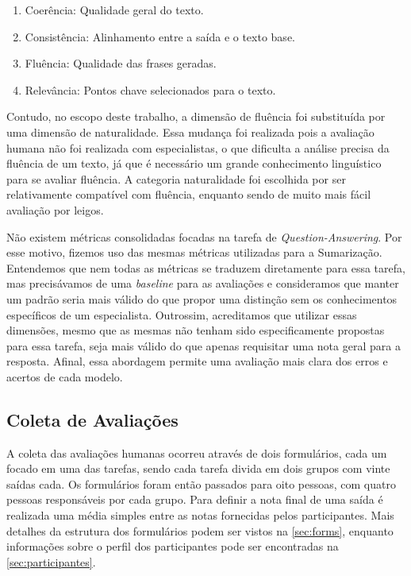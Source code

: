 \documentclass[cic,tc]{iiufrgs}
\begin{document}
\begin{enumerate}
    \item Coerência: Qualidade geral do texto.
    \item Consistência: Alinhamento entre a saída e o texto base.
    \item Fluência: Qualidade das frases geradas.
    \item Relevância: Pontos chave selecionados para o texto.
\end{enumerate}

Contudo, no escopo deste trabalho, a dimensão de fluência foi substituída por uma dimensão de naturalidade. 
Essa mudança foi realizada pois a avaliação humana não foi realizada com especialistas, o que dificulta a análise precisa da fluência de um texto, já que é necessário um grande conhecimento linguístico para se avaliar fluência. 
A categoria naturalidade foi escolhida por ser relativamente compatível com fluência, enquanto sendo de muito mais fácil avaliação por leigos.

Não existem métricas consolidadas focadas na tarefa de \textit{Question-Answering}. Por esse motivo, fizemos uso das mesmas métricas utilizadas para a Sumarização. Entendemos que nem todas as métricas se traduzem diretamente para essa tarefa, mas precisávamos de uma \textit{baseline} para as avaliações e consideramos que manter um padrão seria mais válido do que propor uma distinção sem os conhecimentos específicos de um especialista. Outrossim, acreditamos que utilizar essas dimensões, mesmo que as mesmas não tenham sido especificamente propostas para essa tarefa, seja mais válido do que apenas requisitar uma nota geral para a resposta. Afinal, essa abordagem permite uma avaliação mais clara dos erros e acertos de cada modelo.

\subsection{Coleta de Avaliações}
A coleta das avaliações humanas ocorreu através de dois formulários, cada um focado em uma das tarefas, sendo cada tarefa divida em dois grupos com vinte saídas cada. Os formulários foram então passados para oito pessoas, com quatro pessoas responsáveis por cada grupo. Para definir a nota final de uma saída é realizada uma média simples entre as notas fornecidas pelos participantes. Mais detalhes da estrutura dos formulários podem ser vistos na \autoref{sec:forms}, enquanto informações sobre o perfil dos participantes pode ser encontradas na \autoref{sec:participantes}.
\end{document}
